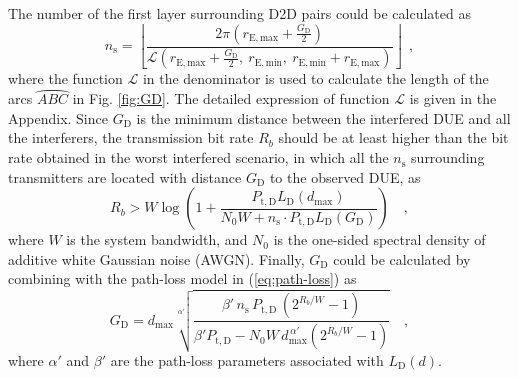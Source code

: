 \documentclass[journal, 10pt]{IEEEtran}
\begin{document}
The number of the first layer surrounding D2D pairs could be calculated as
\begin{equation}
n_\mathrm{s} = \left\lfloor 
\frac{2\pi (r_\mathrm{E, max} + \frac{G_\mathrm{D}}{2})}{\mathcal{L} 
\left(r_\mathrm{E, max} + \frac{G_\mathrm{D}}{2},~
 r_\mathrm{E, min},~ r_\mathrm{E, min} + r_\mathrm{E, max}\right)} 
\right\rfloor~~,
\end{equation}
where the function $\mathcal{L}$ in the denominator is used to
calculate the length of the arcs $\wideparen{ABC}$ in Fig.
\ref{fig:GD}. The detailed expression of function $\mathcal{L}$ is
given in the Appendix. Since $G_\mathrm{D}$ is the minimum distance
between the interfered DUE and all the interferers, the transmission
bit rate $R_b$ should be at least higher than the bit rate obtained in
the worst interfered scenario, in which all the $n_\mathrm{s}$
surrounding transmitters are located with distance $G_\mathrm{D}$ to
the observed DUE, as
\begin{equation}
R_b > W \log \left( 1+ \frac{P_\mathrm{t,D} L _\mathrm{D}(d_{\max}) }
{N_0 W + n_\mathrm{s} \cdot P_\mathrm{t, D} L_\mathrm{D}(G_\mathrm{D})} 
\right)\quad,
\end{equation}
where $W$ is the system bandwidth, and $N_0$ is the one-sided spectral
density of additive white Gaussian noise (AWGN). Finally, $G_\text{D}$
could be calculated by combining with the path-loss model in
(\ref{eq:path-loss}) as
\begin{equation}
 G_\mathrm{D} =  d_{\max} \sqrt[\alpha'] 
 {\frac{\beta' \, n_\mathrm{s}\, P_{\mathrm{t,D}}\,(2^{R_b/W} -1)}
 {\beta' P_{\mathrm{t,D}} - N_0 W \,d_{\max}^{\,\alpha'}  (2^{R_b/W} 
 -1)}}\quad,
\end{equation}
where $\alpha'$ and $\beta'$ are the path-loss parameters associated with 
$L_\mathrm{D}(d)$. 
\end{document}
